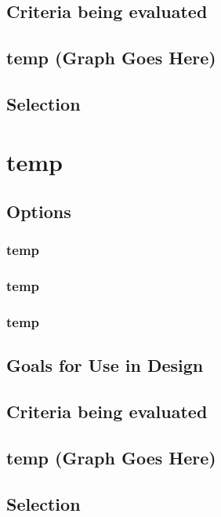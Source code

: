 \documentclass[10pt,letterpaper,onecolumn,journal]{IEEEtran}
\begin{document}
\subsection{Criteria being evaluated}

\subsection*{temp (Graph Goes Here)}

\subsection{Selection}

\section{temp}

\subsection{Options}
\subsubsection{temp}

\subsubsection{temp}

\subsubsection{temp}

\subsection{Goals for Use in Design}

\subsection{Criteria being evaluated}

\subsection*{temp (Graph Goes Here)}

\subsection{Selection}
\end{document}
